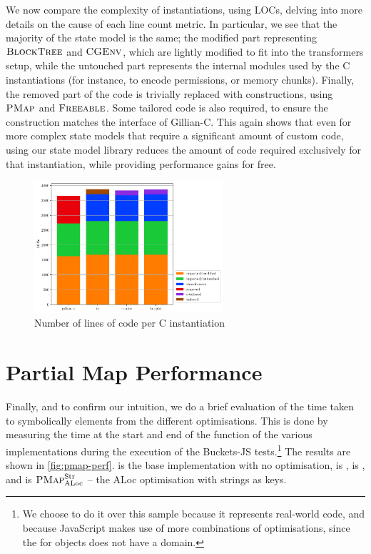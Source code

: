 We now compare the complexity of instantiations, using LOCs, delving into more details on the cause of each line count metric. In particular, we see that the majority of the state model is the same; the modified part representing $\textsc{BlockTree}$ and $\textsc{CGEnv}$, which are lightly modified to fit into the transformers setup, while the untouched part represents the internal modules used by the C instantiations (for instance, to encode permissions, or memory chunks). Finally, the removed part of the code is trivially replaced with constructions, using $\textsc{PMap}$ and $\textsc{Freeable}$. Some tailored code is also required, to ensure the construction matches the interface of Gillian-C. This again shows that even for more complex state models that require a significant amount of custom code, using our state model library reduces the amount of code required exclusively for that instantiation, while providing performance gains for free.

\begin{figure}
	\centering
	\includegraphics[width=7cm]{figures/c/locs.pdf}
	\caption{Number of lines of code per C instantiation}
	\label{fig:c-loc-count}
\end{figure}

\section{Partial Map Performance} \label{sec:perf-pmap}

Finally, and to confirm our intuition, we do a brief evaluation of the time taken to symbolically  elements from the different \PMap{} optimisations. This is done by measuring the time at the start and end of the  function of the various \PMap{} implementations during the execution of the Buckets-JS tests.\footnote{We choose to do it over this sample because it represents real-world code, and because JavaScript makes use of more combinations of optimisations, since the \PMap{} for objects does not have a \Loc{} domain.} The results are shown in \autoref{fig:pmap-perf}.  is the base \PMap{} implementation with no optimisation,  is \SplitPMap,  is \ALocPMap, and  is $\textsc{PMap}_{\text{ALoc}}^{\text{Str}}$ -- the ALoc optimisation with strings as keys.


